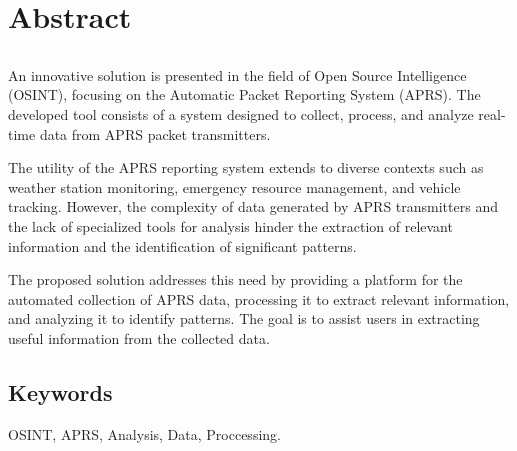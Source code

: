 \chapter*{Abstract}

\section*{\tituloPortadaEngVal}

An innovative solution is presented in the field of Open Source Intelligence (OSINT), focusing on the Automatic Packet Reporting System (APRS). The developed tool consists of a system designed to collect, process, and analyze real-time data from APRS packet transmitters.

The utility of the APRS reporting system extends to diverse contexts such as weather station monitoring, emergency resource management, and vehicle tracking. However, the complexity of data generated by APRS transmitters and the lack of specialized tools for analysis hinder the extraction of relevant information and the identification of significant patterns.

The proposed solution addresses this need by providing a platform for the automated collection of APRS data, processing it to extract relevant information, and analyzing it to identify patterns. The goal is to assist users in extracting useful information from the collected data.


\section*{Keywords}

\noindent OSINT, APRS, Analysis, Data, Proccessing.



